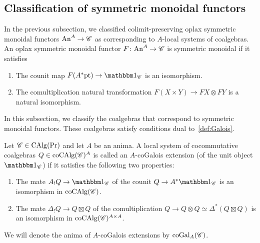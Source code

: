\documentclass[english,svgnames,table]{article}
\begin{document}
\subsection{Classification of symmetric monoidal functors}
\label{subsec:cogal}
    In the previous subsection, we classified colimit-preserving oplax symmetric monoidal functors $\mathrm{An}^A \to \mathscr{C}$ as corresponding to $A$-local systems of coalgebras.
    An oplax symmetric monoidal functor $F \colon \mathrm{An}^A \to \mathscr{C}$ is symmetric monoidal if it satisfies
    \begin{enumerate}[label=(SM\arabic*), leftmargin=*]
        \item \label{cond:SM-1}
        The counit map $F(A^* \pt) \to \ounit_{\cC}$ is an isomorphism.
        \item \label{cond:SM-2}
        The comultiplication natural transformation $F(X \times Y) \to FX \otimes FY$ is a natural isomorphism.
    \end{enumerate}
    In this subsection, we classify the coalgebras that correspond to symmetric monoidal functors. These coalgebras satisfy conditions dual to~\cref{def:Galois}.
        
    \begin{definition}
    \label{def:coGal}
        Let $\mathscr{C}\in \operatorname{CAlg}(\operatorname{Pr})$ and let $A$ be an anima. A local system of cocommutative coalgebras $Q \in \operatorname{coCAlg}(\mathscr{C})^A$ is called an $A$-coGalois extension (of the unit object $\ounit_{\cC}$) if it satisfies the following two properties:
        \begin{enumerate}[label=(cG\arabic*), leftmargin=*]
            \item \label{cond:coGal-1}
            The mate $A_! Q \to \ounit_{\cC}$ of the counit $Q \to A^* \ounit_{\cC}$ is an isomorphism in $\operatorname{coCAlg}(\mathscr{C})$.
            \item \label{cond:coGal-2}
            The mate $\Delta_! Q \to Q \boxtimes Q$ of the comultiplication $Q \to Q \otimes Q \simeq \Delta^*(Q \boxtimes Q)$ is an isomorphism in $\operatorname{coCAlg}(\mathscr{C})^{A\times A}$.
        \end{enumerate}
        We will denote the anima of $A$-coGalois extensions by $\mathrm{coGal}_A(\mathscr{C})$.
    \end{definition}
        
\end{document}
